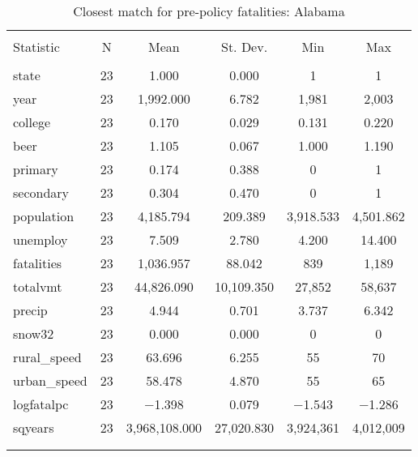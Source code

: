 \documentclass{article}
\begin{document}
\begin{table}[!htbp] \centering 
  \caption{Closest match for pre-policy fatalities: Alabama} 
  \label{tab:a22} 
\begin{tabular}{@{\extracolsep{5pt}}lccccc} 
\\[-1.8ex]\hline 
\hline \\[-1.8ex] 
Statistic & \multicolumn{1}{c}{N} & \multicolumn{1}{c}{Mean} & \multicolumn{1}{c}{St. Dev.} & \multicolumn{1}{c}{Min} & \multicolumn{1}{c}{Max} \\ 
\hline \\[-1.8ex] 
state & 23 & 1.000 & 0.000 & 1 & 1 \\ 
year & 23 & 1,992.000 & 6.782 & 1,981 & 2,003 \\ 
college & 23 & 0.170 & 0.029 & 0.131 & 0.220 \\ 
beer & 23 & 1.105 & 0.067 & 1.000 & 1.190 \\ 
primary & 23 & 0.174 & 0.388 & 0 & 1 \\ 
secondary & 23 & 0.304 & 0.470 & 0 & 1 \\ 
population & 23 & 4,185.794 & 209.389 & 3,918.533 & 4,501.862 \\ 
unemploy & 23 & 7.509 & 2.780 & 4.200 & 14.400 \\ 
fatalities & 23 & 1,036.957 & 88.042 & 839 & 1,189 \\ 
totalvmt & 23 & 44,826.090 & 10,109.350 & 27,852 & 58,637 \\ 
precip & 23 & 4.944 & 0.701 & 3.737 & 6.342 \\ 
snow32 & 23 & 0.000 & 0.000 & 0 & 0 \\ 
rural\_speed & 23 & 63.696 & 6.255 & 55 & 70 \\ 
urban\_speed & 23 & 58.478 & 4.870 & 55 & 65 \\ 
logfatalpc & 23 & $-$1.398 & 0.079 & $-$1.543 & $-$1.286 \\ 
sqyears & 23 & 3,968,108.000 & 27,020.830 & 3,924,361 & 4,012,009 \\ 
\hline \\[-1.8ex] 
\normalsize 
\end{tabular} 
\end{table} 
\end{document}
